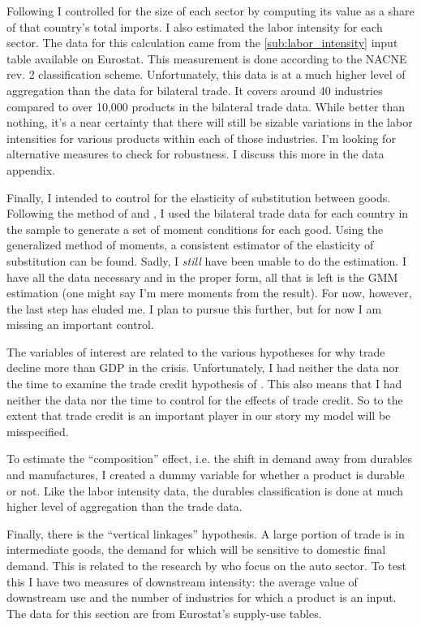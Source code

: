 \documentclass[11pt]{article}
\begin{document}
  Following \cite{llt:2010} I controlled for the size of each sector by computing its value as a share of that country's total imports. I also estimated the labor intensity for each sector.  The data for this calculation came from the \ref{sub:labor_intensity} input table available on Eurostat.  This measurement is done according to the NACNE rev. 2 classification scheme.  Unfortunately, this data is at a much higher level of aggregation than the data for bilateral trade.  It covers around 40 industries compared to over 10,000 products in the bilateral trade data.  While better than nothing, it's a near certainty that there will still be sizable variations in the labor intensities for various products within each of those industries.  I'm looking for alternative measures to check for robustness.  I discuss this more in the data appendix.

  Finally, I intended to control for the elasticity of substitution between goods.  Following the method of \cite{weinstein-broda:2004} and \cite{feenstra:1994}, I used the bilateral trade data for each country in the sample to generate a set of moment conditions for each good.  Using the generalized method of moments, a consistent estimator of the elasticity of substitution can be found. Sadly, I \emph{still} have been unable to do the estimation.  I have all the data necessary and in the proper form, all that is left is the GMM estimation (one might say I'm mere moments from the result).  For now, however, the last step has eluded me. I plan to pursue this further, but for now I am missing an important control.

  The variables of interest are related to the various hypotheses for why trade decline more than GDP in the crisis.  Unfortunately, I had neither the data nor the time to examine the trade credit hypothesis of \cite{chor-manova:2012}.  This also means that I had neither the data nor the time to control for the effects of trade credit.  So to the extent that trade credit is an important player in our story my model will be misspecified.

  To estimate the ``composition'' effect, i.e. the shift in demand away from durables and manufactures, I created a dummy variable for whether a product is durable or not.  Like the labor intensity data, the durables classification is done at much higher level of aggregation than the trade data.
  
  Finally, there is the ``vertical linkages'' hypothesis. A large portion of trade is in intermediate goods, the demand for which will be sensitive to domestic final demand. This is related to the research by \cite{alessandria-kaboski:2010} who focus on the auto sector.  To test this I have two measures of downstream intensity: the average value of downstream use and the number of industries for which a product is an input.  The data for this section are from Eurostat's supply-use tables.
\end{document}
